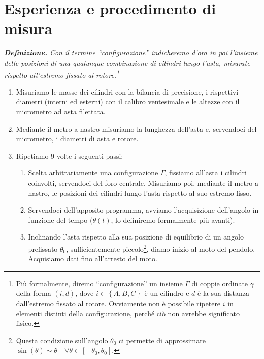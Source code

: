 \documentclass{article}
\begin{document}
\pagebreak
\section{Esperienza e procedimento di misura}

\emph{
  \textbf{Definizione.} Con il termine “\emph{configurazione}”
  indicheremo d'ora in poi l'insieme delle posizioni di una
  qualunque combinazione di cilindri lungo l'asta, misurate
  rispetto all'estremo fissato al rotore.\footnote{
    Più formalmente, diremo “configurazione” un insieme $\Gamma$
    di coppie ordinate $\gamma$ della forma
    $(i,d)$, dove $i\in\left\{A,B,C\right\}$
    è un cilindro e $d$ è la sua distanza dall'estremo fissato
    al rotore. Ovviamente non è possibile ripetere $i$ in elementi
    distinti della configurazione, perché ciò non avrebbe
    significato fisico.
  }
}

\begin{enumerate}
  \item
    Misuriamo le masse dei cilindri con la bilancia di precisione,
    i rispettivi diametri (interni ed esterni) con il calibro
    ventesimale e le altezze con il micrometro ad asta filettata.
  \item
    Mediante il metro a nastro misuriamo la lunghezza dell'asta e,
    servendoci del micrometro, i diametri di asta e rotore.
  \item
    Ripetiamo 9 volte i seguenti passi:
  \begin{enumerate}
    \item
      Scelta arbitrariamente una configurazione $\Gamma$,
      fissiamo all'asta i cilindri coinvolti,
      servendoci del foro centrale.
      Misuriamo poi, mediante il metro a nastro,
      le posizioni dei cilindri lungo l'asta
      rispetto al suo estremo fisso.
    \item
      Servendoci dell'apposito programma, avviamo
      l'acquisizione dell'angolo in funzione del tempo
      ($\theta(t)$, lo definiremo formalmente più avanti).
    \item
      Inclinando l'asta rispetto alla sua posizione di equilibrio
      di un angolo prefissato $\theta_0$,
      sufficientemente piccolo\footnote{
Questa condizione sull'angolo $\theta_0$ ci permette di approssimare
$\sin(\theta) \sim \theta\quad\forall \theta \in [-\theta_0, \theta_0]$.
      }, diamo inizio al moto del pendolo.
      Acquisiamo dati fino all'arresto del moto.
  \end{enumerate}
\end{enumerate}
\end{document}
